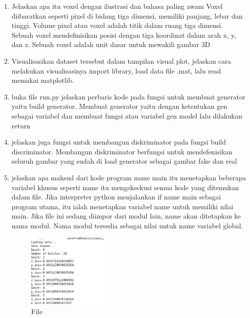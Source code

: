 \begin{enumerate}
        	\item Jelaskan apa itu voxel dengan ilustrasi dan bahasa paling awam
Voxel diibaratkan seperti pixel di bidang tiga dimensi, memiliki panjang, lebar dan tinggi. Volume pixel atau voxel adalah titik dalam ruang tiga dimensi. Sebuah voxel mendefinisikan posisi dengan tiga koordinat dalam arah x, y, dan z. Sebuah voxel adalah unit dasar untuk mewakili gambar 3D

        	\item Visualisasikan dataset tersebut dalam tampilan visual plot, jelaskan cara melakukan visualisasinya
import library, load data file .mat, lalu read memakai matplotlib.

        	\item buka ﬁle run.py jelaskan perbaris kode pada fungsi untuk membuat generator yaitu build generator.
Membuat generator yaitu dengan ketentukan gen sebagai variabel dan membuat fungsi atau variabel gen model lalu dilakukan return

        	\item jelaskan juga fungsi untuk membangun diskriminator pada fungsi build discriminator.
Membangun diskriminator berfungsi untuk mendefenisikan seluruh gambar yang sudah di load generator sebagai gambar fake dan real

        	\item  jelaskan apa maksud dari kode program name  main
itu menetapkan beberapa variabel khusus seperti  name
itu mengeksekusi semua kode yang ditemukan dalam file.
Jika interpreter python menjalankan if name main  sebagai program utama, itu ialah menetapkan variabel name  untuk memiliki nilai main. Jika file ini sedang diimpor dari modul lain, name akan ditetapkan ke nama modul. Nama modul tersedia sebagai nilai untuk name variabel global.

		

		\begin{figure}[H]
			\includegraphics[width=4cm]{figures/1174008/8/praktik11.PNG}
            		\centering
           		\caption{File}
       	 	\end{figure}


\end{enumerate}

